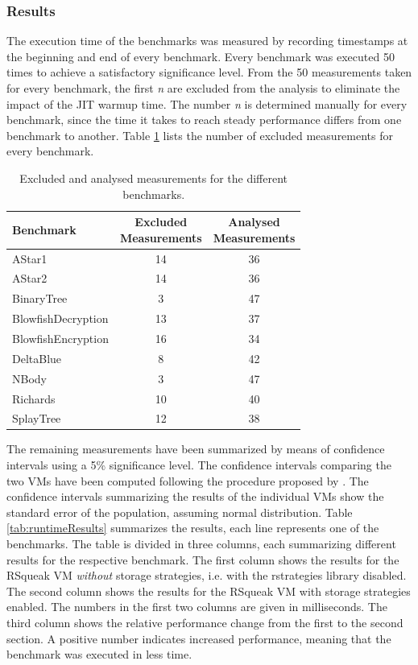 \subsubsection{Results}

The execution time of the benchmarks was measured by recording timestamps at the beginning and end of every benchmark.
Every benchmark was executed 50 times to achieve a satisfactory significance level.
From the 50 measurements taken for every benchmark, the first \emph{n} are excluded from the analysis to eliminate the impact of the JIT warmup time.
The number \emph{n} is determined manually for every benchmark, since the time it takes to reach steady performance differs from one benchmark to another.
Table \ref{tab:excluded} lists the number of excluded measurements for every benchmark.

\begin{table}
\centering
\begin{tabular}[ht]{ l c@{\ \ \ \ }c }
\toprule
Benchmark & \parbox{2.4cm}{Excluded\\Measurements} & \parbox{2.4cm}{Analysed\\Measurements} \\
\midrule
AStar1 & 14 & 36 \\
AStar2 & 14 & 36 \\
BinaryTree & 3 & 47 \\
BlowfishDecryption & 13 & 37 \\
BlowfishEncryption & 16 & 34 \\
DeltaBlue & 8 & 42 \\
NBody & 3 & 47 \\
Richards & 10 & 40 \\
SplayTree & 12 & 38 \\
\bottomrule
\end{tabular}
\caption{Excluded and analysed measurements for the different benchmarks.}
\label{tab:excluded}
\end{table}

The remaining measurements have been summarized by means of confidence intervals using a 5\% significance level.
The confidence intervals comparing the two VMs have been computed following the procedure proposed by \citeauthor{rigorousBenchmarking} \cite{rigorousBenchmarking}.
The confidence intervals summarizing the results of the individual VMs show the standard error of the population, assuming normal distribution.
Table \ref{tab:runtimeResults} summarizes the results, each line represents one of the benchmarks.
The table is divided in three columns, each summarizing different results for the respective benchmark.
The first column shows the results for the RSqueak VM \emph{without} storage strategies, i.e. with the rstrategies library disabled.
The second column shows the results for the RSqueak VM with storage strategies enabled.
The numbers in the first two columns are given in milliseconds.
The third column shows the relative performance change from the first to the second section.
A positive number indicates increased performance, meaning that the benchmark was executed in less time.

